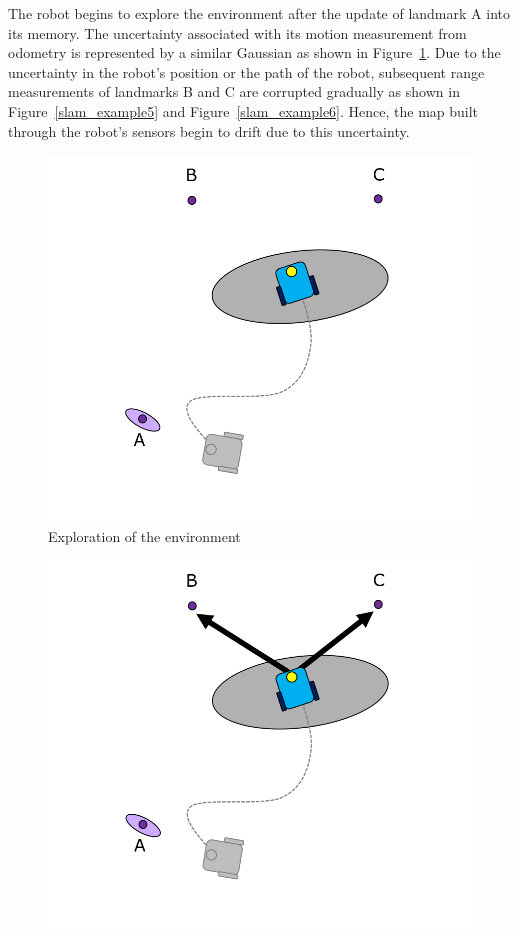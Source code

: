 \begin{exmp}
The robot begins to explore the environment after the update of landmark A into its memory. The uncertainty associated with its motion measurement from odometry is represented by a similar Gaussian as shown in Figure~\ref{slam_example4}. Due to the uncertainty in the robot's position or the path of the robot, subsequent range measurements of landmarks B and C are corrupted gradually as shown in Figure~\ref{slam_example5} and Figure~\ref{slam_example6}. Hence, the map built through the robot's sensors begin to drift due to this uncertainty.
\begin{figure}
\centering
\includegraphics[scale=0.3]{./images/slam_example4}
\caption{Exploration of the environment}
\label{slam_example4}
\end{figure}
\begin{figure}
\centering
\includegraphics[scale=0.3]{./images/slam_example5}

\end{figure}
\end{exmp}
